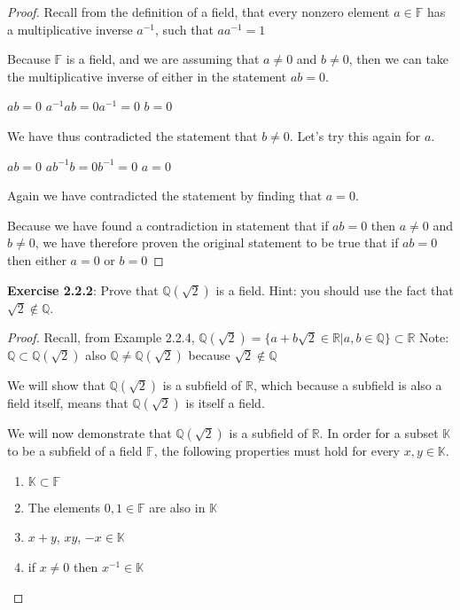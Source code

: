 \documentclass[a4paper]{article}
\begin{document}
\begin{myparindent}{0pt}
\begin{proof}
  Recall from the definition of a field, that every nonzero element
  $a \in \mathbb{F}$ has a multiplicative inverse $a^{-1}$, such that
  $aa^{-1} = 1$ \newline

  Because $\mathbb{F}$ is a field, and we are assuming that $a \ne 0$ and
  $b \ne 0$, then we can take the multiplicative inverse of either in the
  statement $ab = 0$. \newline

  $ab = 0$ \newline
  $a^{-1}ab = 0a^{-1} = 0$ \newline
  $b = 0$ \newline

  We have thus contradicted the statement that $b \ne 0$. Let's try this again
  for $a$. \newline

  $ab = 0$ \newline
  $ab^{-1}b = 0b^{-1} = 0$ \newline
  $a = 0$ \newline

  Again we have contradicted the statement by finding that $a = 0$. \newline

  Because we have found a contradiction in statement that if $ab = 0$ then
  $a \ne 0$ and $b \ne 0$, we have therefore proven the original statement to be
  true that if $ab = 0$ then either $a = 0$ or $b = 0$
\end{proof}

\textbf{Exercise 2.2.2}:
Prove that $\mathbb{Q}(\sqrt{2})$ is a field. Hint: you should use the fact that
$\sqrt{2} \notin \mathbb{Q}$.

\begin{proof}
  Recall, from Example 2.2.4,
  $\mathbb{Q}(\sqrt{2}) = \{ a + b \sqrt{2} \in \mathbb{R} | a, b \in \mathbb{Q} \} \subset \mathbb{R}$ \newline
  Note: $\mathbb{Q} \subset \mathbb{Q}(\sqrt{2})$ also $\mathbb{Q} \ne \mathbb{Q}(\sqrt{2})$
  because $\sqrt{2} \notin \mathbb{Q}$ \newline

  We will show that $\mathbb{Q}(\sqrt{2})$ is a subfield of $\mathbb{R}$, which
  because a subfield is also a field itself, means that $\mathbb{Q}(\sqrt{2})$
  is itself a field. \newline

  We will now demonstrate that $\mathbb{Q}(\sqrt{2})$ is a subfield of $\mathbb{R}$.
  In order for a subset $\mathbb{K}$ to be a subfield of a field $\mathbb{F}$,
  the following properties must hold for every $x, y \in \mathbb{K}$.
  \begin{enumerate}[label=(\roman*)]
    \item $\mathbb{K} \subset \mathbb{F}$
    \item The elements $0, 1 \in \mathbb{F}$ are also in $\mathbb{K}$
    \item $x + y$, $xy$, $-x \in \mathbb{K}$
    \item if $x \ne 0$ then $x^{-1} \in \mathbb{K}$
  \end{enumerate}


\end{proof}
\end{myparindent}
\end{document}
